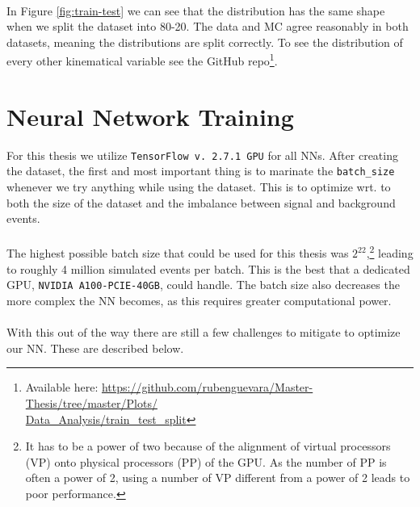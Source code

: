 \documentclass[12pt, a4paper]{book}
\begin{document}
\\In Figure \ref{fig:train-test} we can see that the distribution has the same shape when we split the dataset into 80-20. The data and MC agree reasonably in both datasets, meaning the distributions are split correctly. To see the distribution of every other kinematical variable see the GitHub repo\footnote{Available here: \href{https://github.com/rubenguevara/Master-Thesis/tree/master/Plots/Data_Analysis/train_test_split}{https://github.com/rubenguevara/Master-Thesis/tree/master/Plots/\\Data\_Analysis/train\_test\_split}}.


\clearpage
\section{Neural Network Training}\label{chap:NN_train}
For this thesis we utilize \verb|TensorFlow v. 2.7.1 GPU| for all NNs. After creating the dataset, the first and most important thing is to marinate the \verb|batch_size| whenever we try anything while using the dataset. This is to optimize wrt. to both the size 
of the dataset and the imbalance between signal and background events.\\
\\The highest possible batch size that could be used for this thesis was $2^{22}$,\footnote{It has to be a power of two because of the alignment of virtual processors (VP) onto physical processors (PP) of the GPU. As the number of PP is often a power of 2, using a number of VP different from a power of 2 leads to poor performance.} 
leading to roughly 4 million simulated events per batch. This is the best that a dedicated GPU, \verb|NVIDIA A100-PCIE-40GB|, could handle. The batch size also decreases the more complex the NN becomes, as this requires greater computational power.\\
\\With this out of the way there are still a few challenges to mitigate to optimize our NN. These are described below.
\end{document}
